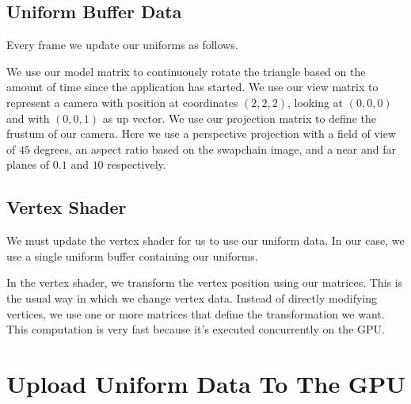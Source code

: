 \subsection{Uniform Buffer Data}

Every frame we update our uniforms as follows.

\begin{minipage}{\linewidth}{\noindent}
    
\end{minipage}

We use our model matrix to continuously rotate the triangle based on the
amount of time since the application has started.
We use our view matrix to represent a camera with position at coordinates
$(2, 2, 2)$, looking at $(0, 0, 0)$ and with $(0, 0, 1)$ as up vector.
We use our projection matrix to define the frustum of our camera.
Here we use a perspective projection with a field of view of $45$ degrees,
an aspect ratio based on the swapchain image, and a near and far planes of
$0.1$ and $10$ respectively.

\subsection{Vertex Shader}

We must update the vertex shader for us to use our uniform data.
In our case, we use a single uniform buffer containing our uniforms.

\begin{minipage}{\linewidth}{\noindent}
    
\end{minipage}

In the vertex shader, we transform the vertex position using our matrices.
This is the usual way in which we change vertex data.
Instead of directly modifying vertices, we use one or more matrices
that define the transformation we want.
This computation is very fast because it's executed concurrently on the GPU.

\section{Upload Uniform Data To The GPU}

